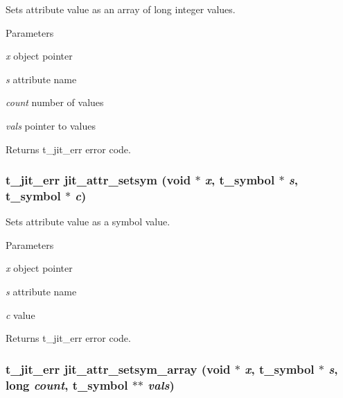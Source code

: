 Sets attribute value as an array of long integer values. 
\begin{DoxyParams}{Parameters}
\item[{\em x}]object pointer \item[{\em s}]attribute name \item[{\em count}]number of values \item[{\em vals}]pointer to values\end{DoxyParams}
\begin{DoxyReturn}{Returns}
t\_\-jit\_\-err error code. 
\end{DoxyReturn}
\hypertarget{group__attrmod_ga94cb0362d0ea100cdda79dd04abea5b3}{
\subsubsection[{jit\_\-attr\_\-setsym}]{\setlength{\rightskip}{0pt plus 5cm}t\_\-jit\_\-err jit\_\-attr\_\-setsym (void $\ast$ {\em x}, \/  {\bf t\_\-symbol} $\ast$ {\em s}, \/  {\bf t\_\-symbol} $\ast$ {\em c})}}
\label{group__attrmod_ga94cb0362d0ea100cdda79dd04abea5b3}


Sets attribute value as a symbol value. 
\begin{DoxyParams}{Parameters}
\item[{\em x}]object pointer \item[{\em s}]attribute name \item[{\em c}]value\end{DoxyParams}
\begin{DoxyReturn}{Returns}
t\_\-jit\_\-err error code. 
\end{DoxyReturn}
\hypertarget{group__attrmod_gaf0bdc59aa8a343f09d9ea4cf17541848}{
\subsubsection[{jit\_\-attr\_\-setsym\_\-array}]{\setlength{\rightskip}{0pt plus 5cm}t\_\-jit\_\-err jit\_\-attr\_\-setsym\_\-array (void $\ast$ {\em x}, \/  {\bf t\_\-symbol} $\ast$ {\em s}, \/  long {\em count}, \/  {\bf t\_\-symbol} $\ast$$\ast$ {\em vals})}}
\label{group__attrmod_gaf0bdc59aa8a343f09d9ea4cf17541848}


